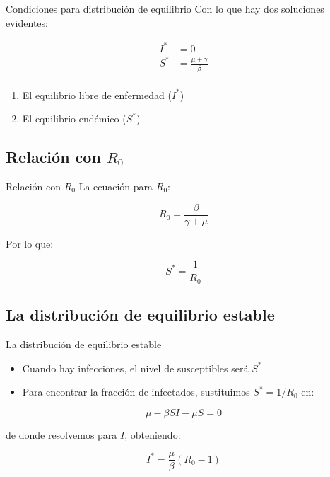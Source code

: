 \documentclass[
  11pt,
  ignorenonframetext,
]{beamer}
\providecommand{\tightlist}{%
  \setlength{\itemsep}{0pt}\setlength{\parskip}{0pt}}
\begin{document}
\begin{frame}{Condiciones para distribución de equilibrio}
Con lo que hay dos soluciones evidentes:

\begin{align}
I^* & = 0\\
S^* & = \frac{\mu + \gamma}{\beta}\\
\end{align}

\begin{enumerate}
\tightlist
\item
  El equilibrio libre de enfermedad (\(I^*\))
\item
  El equilibrio endémico (\(S^*\))
\end{enumerate}
\end{frame}

\hypertarget{relaciuxf3n-con-r_0}{%
\subsection{\texorpdfstring{Relación con
\(R_0\)}{Relación con R\_0}}\label{relaciuxf3n-con-r_0}}

\begin{frame}{Relación con \(R_0\)}
La ecuación para \(R_0\):

\[R_0 = \frac{\beta}{\gamma + \mu}\]

Por lo que:

\[S^* = \frac{1}{R_0}\]
\end{frame}

\hypertarget{la-distribuciuxf3n-de-equilibrio-estable}{%
\subsection{La distribución de equilibrio
estable}\label{la-distribuciuxf3n-de-equilibrio-estable}}

\begin{frame}{La distribución de equilibrio estable}
\begin{itemize}
\item
  Cuando hay infecciones, el nivel de susceptibles será \(S^*\)
\item
  Para encontrar la fracción de infectados, sustituimos \(S^* = 1/R_0\)
  en:
\end{itemize}

\[\mu - \beta S I - \mu S = 0\]

de donde resolvemos para \(I\), obteniendo:

\[I^* = \frac{\mu}{\beta}(R_0 - 1)\]
\end{frame}
\end{document}
